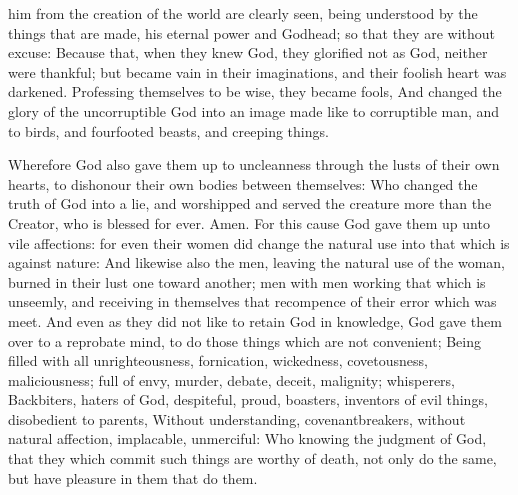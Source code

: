 {him
from the
creation of the
world are clearly
seen, being
understood by the things that are
made,
{}
his
eternal
power
and
Godhead; so
that
they
are without
excuse:
Because
that, when they
knew
God, they
glorified
{}
not
as
God,
neither were
thankful;
but became
vain
in
their
imaginations,
and
their
foolish
heart was
darkened.
Professing
themselves to
be
wise, they became
fools,
And
changed the
glory of the
uncorruptible
God
into an
image made like
to
corruptible
man,
and to
birds,
and fourfooted
beasts,
and creeping
things.
\par }{\PP {}Wherefore
God
also
gave
them
up
to
uncleanness
through the
lusts of their
own
hearts, to
dishonour their
own
bodies
between
themselves:
Who
changed the
truth of
God
into a
lie,
and
worshipped
and
served the
creature more
than the
Creator,
who
is
blessed
for
ever.
Amen.
For
this
cause
God
gave
them
up
unto
vile
affections:
for
even
their
women did
change the
natural
use
into that which
is
against
nature:
And
likewise
also the
men,
leaving the
natural
use of the
woman,
burned
in
their
lust
one
toward
another;
men
with
men
working that which is
unseemly,
and
receiving
in
themselves that
recompence of
their
error
which was
meet.
And even
as they
did
not
like to
retain
God
in
{}
knowledge,
God
gave
them
over
to a
reprobate
mind, to
do those
things which
are
not
convenient;
Being filled
with
all
unrighteousness,
fornication,
wickedness,
covetousness,
maliciousness;
full of
envy,
murder,
debate,
deceit,
malignity;
whisperers,
Backbiters, haters of
God,
despiteful,
proud,
boasters,
inventors of evil
things,
disobedient to
parents,
Without
understanding,
covenantbreakers, without natural
affection,
implacable,
unmerciful:
Who
knowing the
judgment of
God,
that they
which
commit such
things
are
worthy of
death,
not
only
do the
same,
but have pleasure
in them
that do
them.

}
